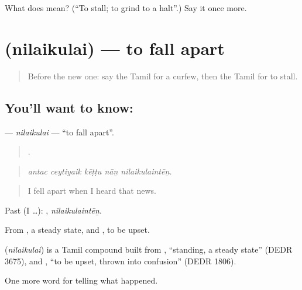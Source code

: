 \begin{tcolorbox}[breakable,colback=teal!4,colframe=teal!35!black,title={Before you move on}]
What does  mean? (\textquotedblleft{}To stall; to grind to a halt\textquotedblright{}.) Say it once more.
\end{tcolorbox}
\section[\texorpdfstring{\ta{நிலைகுலை} (nilaikulai)}{நிலைகுலை (nilaikulai)}]{ (nilaikulai) — to fall apart}

\label{lesson:TA-C300-nilaikulai}



\begin{quote}
Before the new one: say the Tamil for a curfew, then the Tamil for to stall.
\end{quote}

\subsection*{You'll want to know: }
\textbf{} — \emph{nilaikulai} — \textquotedblleft{}to fall apart\textquotedblright{}.

\begin{quote}
    .
\end{quote}

\begin{quote}
\emph{antac ceytiyaik kēṭṭu nāṉ nilaikulaintēṉ.}
\end{quote}

\begin{quote}
I fell apart when I heard that news.
\end{quote}

Past (I …): , \emph{nilaikulaintēṉ}.

From , a steady state, and , to be upset.

\begin{cousinweb}
\textbf{} (\emph{nilaikulai}) is a Tamil compound built from , \textquotedblleft{}standing, a steady state\textquotedblright{} (DEDR 3675), and , \textquotedblleft{}to be upset, thrown into confusion\textquotedblright{} (DEDR 1806).
\end{cousinweb}

\begin{grammarlens}[title={What you've built}]
One more word for telling what happened.
\end{grammarlens}

